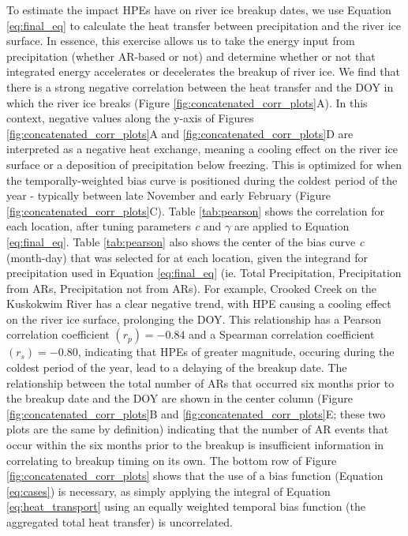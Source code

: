 \documentclass[12pts,draft]{AR_analysis_}
\begin{document}
To estimate the impact HPEs have on river ice breakup dates, we use 
Equation \ref{eq:final_eq} to calculate the heat transfer
between precipitation and the river ice surface. In essence, this 
exercise allows us to take the energy input from precipitation 
(whether AR-based or not) and determine whether or not that integrated 
energy accelerates or decelerates the breakup of river ice. 
We find that there is a strong negative correlation between the heat 
transfer and the DOY 
in which the river ice breaks (Figure
\ref{fig:concatenated_corr_plots}A). In this context, negative values 
along the y-axis of Figures \ref{fig:concatenated_corr_plots}A and 
\ref{fig:concatenated_corr_plots}D 
are interpreted
as a negative heat exchange, meaning a cooling effect on the river ice
surface or a deposition of precipitation below freezing. This is optimized for 
when the temporally-weighted bias curve
is positioned during the coldest period of the year - typically between
late November and early February (Figure \ref{fig:concatenated_corr_plots}C).
Table \ref{tab:pearson} shows the correlation for each location, after
tuning parameters \emph{c} and $\gamma$ are applied to Equation \ref{eq:final_eq}.
Table \ref{tab:pearson} also shows the center of the bias curve \emph{c} (month-day)
that was selected for at each location, given the integrand for precipitation used in
Equation \ref{eq:final_eq} (ie. Total Precipitation, Precipitation from ARs, Precipitation
not from ARs). 
For example, Crooked Creek on the Kuskokwim River has a
clear negative trend, with HPE causing a cooling effect on the
river ice surface, prolonging the DOY. This relationship has a Pearson correlation
coefficient $ (r_{p} )= -0.84$ and a Spearman correlation coefficient
$(r_{s}) = -0.80$, indicating that HPEs of greater magnitude, occuring 
during the coldest period of the year, lead to a delaying of the breakup date. 
The relationship between the total
number of ARs that occurred six months prior to the breakup date and the
DOY are shown in the center column 
(Figure \ref{fig:concatenated_corr_plots}B and 
\ref{fig:concatenated_corr_plots}E; 
these two plots are the same by
definition) indicating that the number of AR 
events that occur within the six months prior to the breakup
is insufficient information 
in correlating to breakup timing on its own. The
bottom row of Figure \ref{fig:concatenated_corr_plots} shows that the
use of a bias function (Equation \ref{eq:cases}) is necessary, as simply 
applying the integral of Equation \ref{eq:heat_transport} using an 
equally weighted temporal bias function (the aggregated total heat 
transfer) is uncorrelated. 
\end{document}
